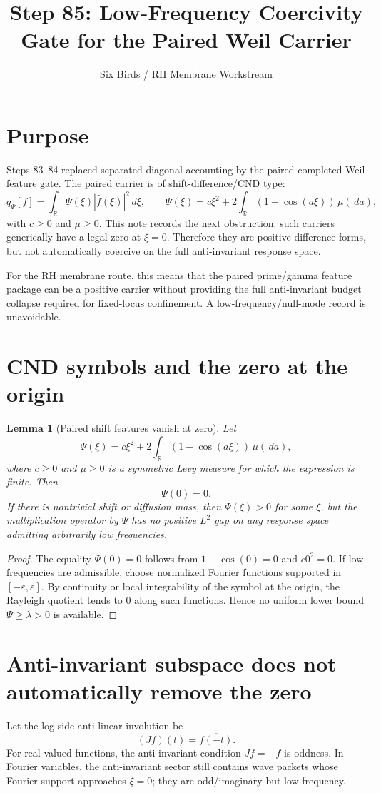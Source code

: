 \documentclass[11pt]{article}
\title{Step 85: Low-Frequency Coercivity Gate for the Paired Weil Carrier}
\author{Six Birds / RH Membrane Workstream}
\date{}
\newtheorem{lemma}{Lemma}
\newcommand{\R}{\mathbb R}
\newcommand{\dd}{\,d}
\begin{document}
\maketitle

\section{Purpose}
Steps 83--84 replaced separated diagonal accounting by the paired completed Weil feature gate. The paired carrier is of shift-difference/CND type:
\[
  q_\Psi[f]=\int_\R \Psi(\xi)|\widehat f(\xi)|^2\dd\xi,
  \qquad
  \Psi(\xi)=c\xi^2+2\int_\R(1-\cos(a\xi))\,\mu(\dd a),
\]
with $c\ge0$ and $\mu\ge0$. This note records the next obstruction: such carriers generically have a legal zero at $\xi=0$. Therefore they are positive difference forms, but not automatically coercive on the full anti-invariant response space.

For the RH membrane route, this means that the paired prime/gamma feature package can be a positive carrier without providing the full anti-invariant budget collapse required for fixed-locus confinement. A low-frequency/null-mode record is unavoidable.

\section{CND symbols and the zero at the origin}

\begin{lemma}[Paired shift features vanish at zero]
Let
\[
  \Psi(\xi)=c\xi^2+2\int_\R(1-\cos(a\xi))\,\mu(\dd a),
\]
where $c\ge0$ and $\mu\ge0$ is a symmetric Levy measure for which the expression is finite. Then
\[
  \Psi(0)=0.
\]
If there is nontrivial shift or diffusion mass, then $\Psi(\xi)>0$ for some $\xi$, but the multiplication operator by $\Psi$ has no positive $L^2$ gap on any response space admitting arbitrarily low frequencies.
\end{lemma}

\begin{proof}
The equality $\Psi(0)=0$ follows from $1-\cos(0)=0$ and $c0^2=0$. If low frequencies are admissible, choose normalized Fourier functions supported in $[-\varepsilon,\varepsilon]$. By continuity or local integrability of the symbol at the origin, the Rayleigh quotient tends to $0$ along such functions. Hence no uniform lower bound $\Psi\ge\lambda>0$ is available.\end{proof}

\section{Anti-invariant subspace does not automatically remove the zero}
Let the log-side anti-linear involution be
\[
  (Jf)(t)=\overline{f(-t)}.
\]
For real-valued functions, the anti-invariant condition $Jf=-f$ is oddness. In Fourier variables, the anti-invariant sector still contains wave packets whose Fourier support approaches $\xi=0$; they are odd/imaginary but low-frequency.
\end{document}
